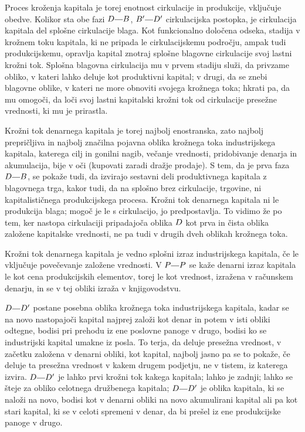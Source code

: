 \documentclass[kapital_02.tex]{subfiles}
\begin{document}
Proces kroženja kapitala je torej enotnost cirkulacije in produkcije, vključuje obedve. Kolikor sta obe fazi \(\KPED\KPEcrta\KPEB\), \(\KPEB'\KPEcrta\KPED'\) cirkulacijska postopka, je cirkulacija kapitala del splošne cirkulacije blaga. Kot funkcionalno določena odseka, stadija v krožnem toku kapitala, ki ne pripada le cirkulacijskemu področju, ampak tudi produkcijskemu, opravlja kapital znotraj splošne blagovne cirkulacije svoj lastni krožni tok. Splošna blagovna cirkulacija mu v prvem stadiju služi, da privzame obliko, v kateri lahko deluje kot produktivni kapital; v drugi, da se znebi blagovne oblike, v kateri ne more obnoviti svojega krožnega toka; hkrati pa, da mu omogoči, da loči svoj lastni kapitalski krožni tok od cirkulacije presežne vrednosti, ki mu je prirastla.

Krožni tok denarnega kapitala je torej najbolj enostranska, zato najbolj prepričljiva in najbolj značilna pojavna oblika krožnega toka industrijskega kapitala, katerega cilj in gonilni nagib, večanje vrednosti, pridobivanje denarja in akumulacija, bije v oči (kupovati zaradi dražje prodaje). S tem, da je prva faza \(\KPED\KPEcrta\KPEB\), se pokaže tudi, da izvirajo sestavni deli produktivnega kapitala z blagovnega trga, kakor tudi, da na splošno brez cirkulacije, trgovine, ni kapitalističnega produkcijskega procesa. Krožni tok denarnega kapitala ni le produkcija blaga; mogoč je le s cirkulacijo, jo predpostavlja. To vidimo že po tem, ker nastopa cirkulaciji pripadajoča oblika \(D\) kot prva in čista oblika založene kapitalske vrednosti, ne pa tudi v drugih dveh oblikah krožnega toka.

Krožni tok denarnega kapitala je vedno splošni izraz industrijskega kapitala, če le vključuje povečevanje založene vrednosti. V \(\KPEP\KPEcrta\KPEP\) se kaže denarni izraz kapitala le kot cena produkcijskih elementov, torej le kot vrednost, izražena v računskem denarju, in se v tej obliki izraža v knjigovodstvu.

\(\KPED\KPEcrta\KPED'\) postane posebna oblika krožnega toka industrijskega kapitala, kadar se na novo nastopajoči kapital najprej založi kot denar in potem v isti obliki odtegne, bodisi pri prehodu iz ene poslovne panoge v drugo, bodisi ko se industrijski kapital umakne iz posla. To terja, da deluje presežna vrednost, v začetku založena v denarni obliki, kot kapital, najbolj jasno pa se to pokaže, če deluje ta presežna vrednost v kakem drugem podjetju, ne v tistem, iz katerega izvira. \(\KPED\KPEcrta\KPED'\) je lahko prvi krožni tok kakega kapitala; lahko je zadnji; lahko se šteje za obliko celotnega družbenega kapitala; \(\KPED\KPEcrta\KPED'\) je oblika kapitala, ki se naloži na novo, bodisi kot v denarni obliki na novo akumulirani kapital ali pa kot stari kapital, ki se v celoti spremeni v denar, da bi prešel iz ene produkcijske panoge v drugo.
\end{document}
